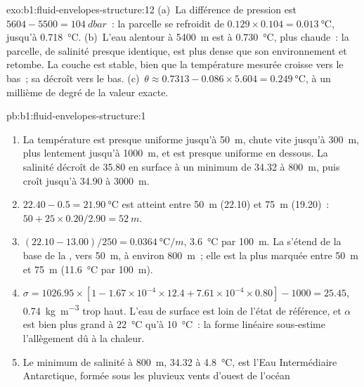 \begin{solution}{exo:b1:fluid-envelopes-structure:12}
(a)~La différence de pression est $5604 - 5500 = \qty{104}{dbar}$~: la parcelle se refroidit
de $0.129 \times 0.104 = \qty{0.013}{\celsius}$, jusqu'à \qty{0.718}{\celsius}.
(b)~L'eau alentour à \qty{5400}{m} est à \qty{0.730}{\celsius}, plus chaude~: la
parcelle, de salinité presque identique, est plus dense que son environnement et retombe.
La couche est stable, bien que la température mesurée croisse
vers le bas~; sa  décroît vers le bas. (c)~$\theta \approx
0.7313 - 0.086 \times 5.604 = \qty{0.249}{\celsius}$, à un millième de
degré de la valeur exacte.
\end{solution}

\begin{solution}{pb:b1:fluid-envelopes-structure:1}
\begin{enumerate}
  \item La température est presque uniforme jusqu'à \qty{50}{m}, chute vite jusqu'à
        \qty{300}{m}, plus lentement jusqu'à \qty{1000}{m}, et est presque uniforme en dessous.
        La salinité décroît de 35.80 en surface à un minimum de 34.32 à
        \qty{800}{m}, puis croît jusqu'à 34.90 à \qty{3000}{m}.
  \item $22.40 - 0.5 = \qty{21.90}{\celsius}$ est atteint entre \qty{50}{m}
        (22.10) et \qty{75}{m} (19.20)~: $50 + 25 \times 0.20/2.90 = \qty{52}{m}$.
  \item $(22.10 - 13.00)/250 = \qty{0.0364}{\celsius/m}$, \qty{3.6}{\celsius}
        par \qty{100}{m}. La  s'étend de la base de la , vers \qty{50}{m}, à environ \qty{800}{m}~; elle est la plus marquée entre
        \qty{50}{m} et \qty{75}{m} (\qty{11.6}{\celsius} par \qty{100}{m}).
  \item $\sigma = 1026.95 \times [1 - 1.67\times10^{-4} \times 12.4 +
        7.61\times10^{-4} \times 0.80] - 1000 = 25.45$, \qty{0.74}{kg.m^{-3}} trop
        haut. L'eau de surface est loin de l'état de référence, et $\alpha$
        est bien plus grand à \qty{22}{\celsius} qu'à \qty{10}{\celsius}~: la
        forme linéaire sous-estime l'allègement dû à la chaleur.
  \item Le minimum de salinité à \qty{800}{m}, 34.32 à \qty{4.8}{\celsius}, est
        l'Eau Intermédiaire Antarctique, formée sous les pluvieux vents d'ouest de l'océan

\end{enumerate}
\end{solution}
